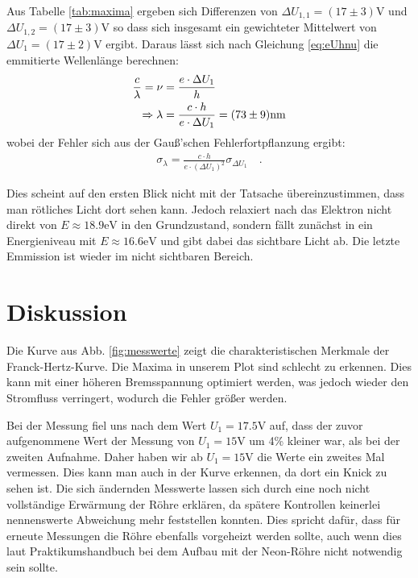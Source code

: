 \documentclass[12pt,a4paper,titlepage,headinclude,bibtotoc]{scrartcl}
\begin{document}
Aus Tabelle \ref{tab:maxima} ergeben sich Differenzen von $\Delta U_{1,1}=(17\pm 3)\si\volt$ und $\Delta U_{1,2}=(17 \pm 3)\si\volt$ so dass sich insgesamt ein gewichteter Mittelwert von $\Delta U_1=(17\pm 2)\si\volt$ ergibt.
Daraus lässt sich nach Gleichung \eqref{eq:eUhnu} die emmitierte Wellenlänge berechnen:
\begin{align}
\frac{c}{\lambda}=\nu &= \frac{e\cdot\Delta U_1}{h}\notag\\
\Rightarrow \lambda&=\frac{c\cdot h}{e\cdot\Delta U_1}=(73\pm 9)\si{\nano\metre}
\end{align}
wobei der Fehler sich aus der Gauß'schen Fehlerfortpflanzung ergibt:
\begin{align}
\sigma_\lambda=\frac{c\cdot h}{e\cdot(\Delta U_1)^2}\sigma_{\Delta U_1}\quad .
\end{align}

Dies scheint auf den ersten Blick nicht mit der Tatsache übereinzustimmen, dass man rötliches Licht dort sehen kann.
Jedoch relaxiert nach \cite[13.03.2015, 19 Uhr]{UniWuppertal} das Elektron nicht direkt von $E\approx 18.9\si\electronvolt$ in den Grundzustand, sondern fällt zunächst in ein Energieniveau mit $E\approx 16.6\si{\electronvolt}$ und gibt dabei das sichtbare Licht ab.
Die letzte Emmission ist wieder im nicht sichtbaren Bereich.

\section{Diskussion}
\label{sec:diskussion}
Die Kurve aus Abb. \ref{fig:messwerte} zeigt die charakteristischen Merkmale der Franck-Hertz-Kurve.
Die Maxima in unserem Plot sind schlecht zu erkennen.
Dies kann mit einer höheren Bremsspannung optimiert werden, was jedoch wieder den Stromfluss verringert, wodurch die Fehler größer werden.

Bei der Messung fiel uns nach dem Wert $U_1=17.5\si\volt$ auf, dass der zuvor aufgenommene Wert der Messung von $U_1=15\si\volt$ um 4\% kleiner war, als bei der zweiten Aufnahme.
Daher haben wir ab $U_1=15\si\volt$ die Werte ein zweites Mal vermessen.
Dies kann man auch in der Kurve erkennen, da dort ein Knick zu sehen ist.
Die sich ändernden Messwerte lassen sich durch eine noch nicht vollständige Erwärmung der Röhre erklären, da spätere Kontrollen keinerlei nennenswerte Abweichung mehr feststellen konnten.
Dies spricht dafür, dass für erneute Messungen die Röhre ebenfalls vorgeheizt werden sollte, auch wenn dies laut Praktikumshandbuch bei dem Aufbau mit der Neon-Röhre nicht notwendig sein sollte.
\end{document}
